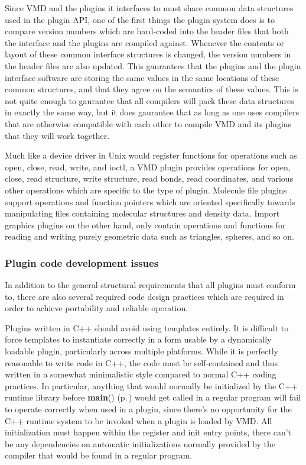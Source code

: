  Since VMD and the plugins it interfaces to must share common data  structures used in the plugin API, one of the first things the plugin system does is to compare version numbers which are hard-coded into the header files that both the interface and the plugins are compiled  against. Whenever the contents or layout of these common interface structures is changed, the version numbers in the header files are  also updated. This gaurantees that the plugins and the plugin interface software are storing the same values in the same locations of these common structures, and that they agree on the semantics of these values. This is not quite enough to gaurantee that all compilers will pack these data structures in exactly the same way, but it does gaurantee that as long as one uses compilers that are otherwise compatible with each other to compile VMD and its plugins that they will work together.



 Much like a device driver in Unix would register functions for  operations such as open, close, read, write, and ioctl, a VMD plugin provides operations for open, close, read structure, write  structure, read bonds, read coordinates, and various other operations which are specific to the type of plugin. Molecule file plugins support operations and function pointers which are oriented specifically towards manipulating files containing molecular structures and density data. Import graphics plugins on the other hand, only contain operations and functions for reading and writing purely geometric data such as triangles,  spheres, and so on.



 \subsubsection*{Plugin code development issues}
 In addition to the general structural requirements that all plugins must conform to, there are also several required code  design practices which are required in order to achieve portability and reliable operation.



 Plugins written in C++ should avoid using templates entirely. It is difficult to force templates to instantiate correctly in a form usable by a dynamically loadable plugin, particularly across multiple platforms. While it is perfectly reasonable to write code in C++, the code must be self-contained and thus written in a somewhat minimalistic style compared to normal C++ coding practices. In particular, anything that would normally be initialized by the C++ runtime library before {\bf main}() {\rm (p.\,\pageref{main_8c_a3})} would get called in a regular program will fail to operate correctly when used in a plugin, since there's no opportunity for the C++ runtime system to be invoked when a plugin is loaded by VMD. All initialization must happen within the register and init entry points, there can't be any dependencies on automatic  initializations normally provided by the compiler that would be found in a regular program.



